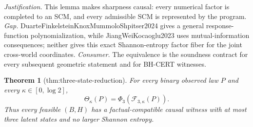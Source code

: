 \documentclass{article}
\newtheorem{theorem}{Theorem}
\begin{document}
\par\smallskip\noindent \textit{Justification.} This lemma makes sharpness causal: every numerical factor is completed to an SCM, and every admissible SCM is represented by the program. \textit{Gap.} DuarteFinkelsteinKnoxMummoloShpitser2024 gives a general response-function polynomialization, while JiangWeiKocaoglu2023 uses mutual-information consequences; neither gives this exact Shannon-entropy factor fiber for the joint cross-world coordinates. \textit{Consumer.} The equivalence is the soundness contract for every subsequent geometric statement and for BH-CERT witnesses.

\begin{theorem}[thm:three-state-reduction]\label{thm:three-state-reduction}
For every binary observed law \(P\) and every \(\kappa\in[0,\log2]\), \[\Theta_\kappa(P)=\Phi_3(\mathcal F_{3,\kappa}(P)).\] Thus every feasible \((B,H)\) has a factual-compatible causal witness with at most three latent states and no larger Shannon entropy.
\end{theorem}
\end{document}
